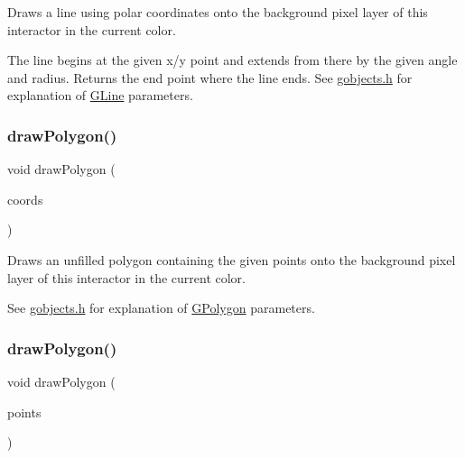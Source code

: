 Draws a line using polar coordinates onto the background pixel layer of this interactor in the current color. 

The line begins at the given x/y point and extends from there by the given angle and radius. Returns the end point where the line ends. See \mbox{\hyperlink{gobjects_8h_source}{gobjects.\+h}} for explanation of \mbox{\hyperlink{classGLine}{G\+Line}} parameters. \mbox{\label{classGDrawingSurface_afddec0a905108d8a8d6809a157f26776}} 
\subsubsection{\texorpdfstring{draw\+Polygon()}{drawPolygon()}\hspace{0.1cm}{\footnotesize\ttfamily [1/2]}}
{\footnotesize\ttfamily void draw\+Polygon (\begin{DoxyParamCaption}\item[{std\+::initializer\+\_\+list$<$ double $>$}]{coords }\end{DoxyParamCaption})\hspace{0.3cm}{\ttfamily [virtual]}}



Draws an unfilled polygon containing the given points onto the background pixel layer of this interactor in the current color. 

See \mbox{\hyperlink{gobjects_8h_source}{gobjects.\+h}} for explanation of \mbox{\hyperlink{classGPolygon}{G\+Polygon}} parameters. \mbox{\label{classGDrawingSurface_a021ee881e0d154dc4dd059698742889c}} 
\subsubsection{\texorpdfstring{draw\+Polygon()}{drawPolygon()}\hspace{0.1cm}{\footnotesize\ttfamily [2/2]}}
{\footnotesize\ttfamily void draw\+Polygon (\begin{DoxyParamCaption}\item[{std\+::initializer\+\_\+list$<$ \mbox{\hyperlink{structGPoint}{G\+Point}} $>$}]{points }\end{DoxyParamCaption})\hspace{0.3cm}{\ttfamily [virtual]}}




